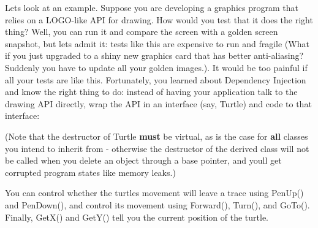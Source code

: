 Let\textquotesingle{}s look at an example. Suppose you are developing a graphics program that relies on a L\+O\+G\+O-\/like A\+PI for drawing. How would you test that it does the right thing? Well, you can run it and compare the screen with a golden screen snapshot, but let\textquotesingle{}s admit it\+: tests like this are expensive to run and fragile (What if you just upgraded to a shiny new graphics card that has better anti-\/aliasing? Suddenly you have to update all your golden images.). It would be too painful if all your tests are like this. Fortunately, you learned about Dependency Injection and know the right thing to do\+: instead of having your application talk to the drawing A\+PI directly, wrap the A\+PI in an interface (say, {\ttfamily Turtle}) and code to that interface\+:


\begin{DoxyCode}{0}
\DoxyCodeLine{\};}
\end{DoxyCode}


(Note that the destructor of {\ttfamily Turtle} {\bfseries{must}} be virtual, as is the case for {\bfseries{all}} classes you intend to inherit from -\/ otherwise the destructor of the derived class will not be called when you delete an object through a base pointer, and you\textquotesingle{}ll get corrupted program states like memory leaks.)

You can control whether the turtle\textquotesingle{}s movement will leave a trace using {\ttfamily Pen\+Up()} and {\ttfamily Pen\+Down()}, and control its movement using {\ttfamily Forward()}, {\ttfamily Turn()}, and {\ttfamily Go\+To()}. Finally, {\ttfamily Get\+X()} and {\ttfamily Get\+Y()} tell you the current position of the turtle.

